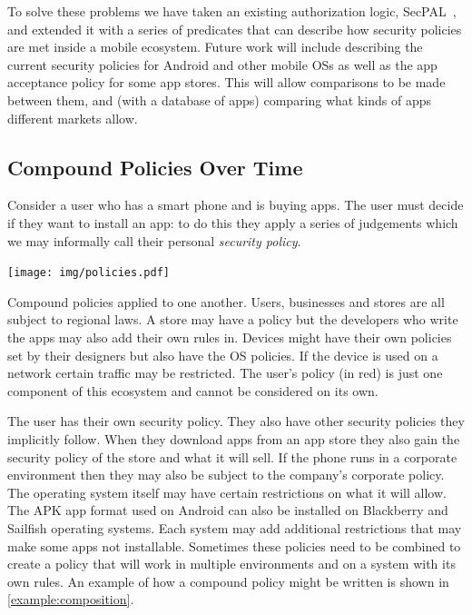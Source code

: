 \documentclass[a4paper,sfsidenotes]{%
  scrartcl%
}
\begin{document}
To solve these problems we have taken an existing authorization logic,
SecPAL~\cite{Becker:2006vh}, and extended it with a series of predicates that
can describe how security policies are met inside a mobile ecosystem.  Future
work will include describing the current security policies for Android and other
mobile OSs as well as the app acceptance policy for some app stores.  This will
allow comparisons to be made between them, and (with a database of apps)
comparing what kinds of apps different markets allow.

\subsection{Compound Policies Over Time}\label{sec:polovertime}

Consider a user who has a smart phone and is buying apps.  The user must decide
if they want to install an app: to do this they apply a series of judgements
which we may informally call their personal \emph{security policy}.  

\begin{marginfigure}
  \texttt{[image: img/policies.pdf]}
  \caption[Compound policies applied to one another.]{Compound policies applied to one another.  Users, businesses
  and stores are all subject to regional laws.  A store may have a policy but
the developers who write the apps may also add their own rules in.  Devices
might have their own policies set by their designers but also have the OS
policies.  If the device is used on a network certain traffic may be restricted.
The user's policy (in red) is just one component of this ecosystem and cannot be
considered on its own.}
  \label{fig:policies}
\end{marginfigure}

The user has their own security policy. They also have other security policies
they implicitly follow.  When they download apps from an app store they also
gain the security policy of the store and what it will sell.  If the phone runs
in a corporate environment then they may also be subject to the company's
corporate policy.  The operating system itself may have certain restrictions on
what it will allow.  The APK app format used on Android can also be installed on
Blackberry and Sailfish operating systems.  Each system may add additional
restrictions that may make some apps not installable.  Sometimes these policies
need to be combined to create a policy that will work in multiple environments
and on a system with its own rules.  An example of how a compound policy might
be written is shown in \autoref{example:composition}.
\end{document}

